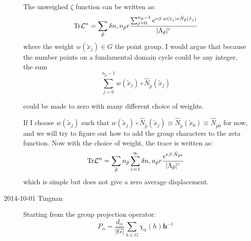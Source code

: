 \begin{description}
The unweighed $\zeta$ function can be written as:
\[
{\rm Tr}\mathcal{L}^{n}=\sum_{\tilde{p}}\delta n,n_{\tilde{p}}r\frac{\sum_{j=0}^{n_{\tilde{p}}-1}e^{r\beta\cdot w(\tilde{x}_{j})\circ\hat{N}_{\tilde{p}}(\tilde{x}_{j})}}{\vert\Lambda_{\tilde{p}}\vert^{r}}
\]
where the weight $w(\tilde{x}_{j})\in G$ the point group. I would
argue that because the number points on a fundamental domain cycle
could be any integer, the sum
\[
\sum_{j=0}^{n_{\tilde{p}}-1}w(\tilde{x}_{j})\circ\hat{N}_{\tilde{p}}(\tilde{x}_{j})
\]


could be made to zero with many different choice of weights.

If I choose $w(\tilde{x}_{j})$ such that $w(\tilde{x}_{j})\circ\hat{N}_{\tilde{p}}(\tilde{x}_{j})\equiv\hat{N}_{\tilde{p}}(\tilde{x}_{0})\equiv\hat{N}_{\tilde{p}0}$
for now, and we will try to figure out how to add the group characters
to the zeta function. Now with the choice of weight, the trace is
written as:
\[
{\rm Tr}\mathcal{L}^{n}=\sum_{\tilde{p}}n_{\tilde{p}}\sum_{r=1}^{\infty}\delta n,n_{\tilde{p}}r\frac{e^{r\beta\cdot\hat{N}_{\tilde{p}0}}}{\vert\Lambda_{\tilde{p}}\vert^{r}}
\]
which is simple but does not give a zero average displacement.


\item[2014-10-01 Tingnan]

Starting from the group projection operator:
\[
P_{\alpha}=\frac{d_{\alpha}}{\vert G\vert}\sum_{h\in G}\chi_{\alpha}(h)\mathbf{h}^{-1}
\]



\end{description}

